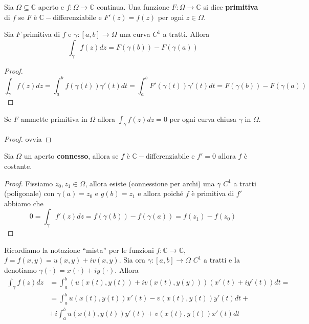 \begin{definition}[Primitiva]
    Sia \(\Omega \subseteq \mathbb{C}\) aperto e \(f : \Omega \to \mathbb{C}\)
    continua. Una funzione \(F : \Omega \to \mathbb{C}\) si dice \textbf{primitiva} di
    \(f\) se \(F\) è \(\mathbb{C}-\)differenziabile e \(F'(z) = f(z)\) per ogni
    \(z \in \Omega\).
\end{definition}
\begin{proposition}
    Sia \(F\) primitiva di \(f\) e \(\gamma:[a,b] \to \Omega\) una curva
    \(C^{1}\) a tratti. Allora 
    \[
        \int_{\gamma} f(z) dz = F{(\gamma{(b)})} - F{(\gamma{(a)})}
    \]
\end{proposition}
\begin{proof}
    \[
        \int_{\gamma} f(z) dz = \int_{a}^{b} f{(\gamma{(t)})}\gamma'(t) dt =
        \int_{a}^{b} F'{(\gamma{(t)})}\gamma'(t) dt = F{(\gamma{(b)})} -
        F{(\gamma{(a)})}
    \]
\end{proof}
\begin{corollary}\label{cor:primitiva_zero}
    Se \(F\) ammette primitiva in \(\Omega\) allora \(\int_{\gamma} f(z) dz =
    0\) per ogni curva chiusa \(\gamma\) in \(\Omega\).
\end{corollary}
\begin{proof}
    ovvia
\end{proof}
\begin{corollary}
    Sia \(\Omega\) un aperto \textbf{connesso}, allora se \(f\) è
    \(\mathbb{C}-\)differenziabile e \(f'=0\) allora \(f\) è costante.
\end{corollary}
\begin{proof}
    Fissiamo \(z_{0}, z_{1} \in \Omega\), allora esiste (connessione per archi)
    una \(\gamma\) \(C^{1}\) a tratti (poligonale) con \(\gamma{(a)}=z_{0}\) e
    \(g{(b)}=z_{1}\) e allora poiché \(f\) è primitiva di \(f'\) abbiamo che 
    \[
        0 = \int_{\gamma} f'(z) dz = f{(\gamma{(b)})} - f{(\gamma{(a)})} =
        f(z_{1}) - f(z_{0})
    \]
\end{proof}
Ricordiamo la notazione ``mista'' per le funzioni \(f: \mathbb{C} \to
\mathbb{C}\), \(f = f(x, y) = u(x, y) + i v {(x, y)}\). Sia ora \(\gamma: [a,b]
\to \Omega\) \(C^{1}\) a tratti e la denotiamo \(\gamma(\cdot) = x{(\cdot )} +
iy(\cdot )\). Allora 
\begin{align*}
    \int_{\gamma} f(z) dz &= \int_{a}^{b} {\left( u(x(t), y(t)) + i v(x(t),y(y))
    \right)} (x'(t) + i y'(t))dt = \\
                          &= \int_{a}^{b} u(x(t), y(t)) x'(t) - v(x(t), y(t))
            y'(t) dt + \\ &+ i \int_{a}^{b} u(x(t), y(t)) y'(t) +
                          v(x(t), y(t)) x'(t) dt
\end{align*}
